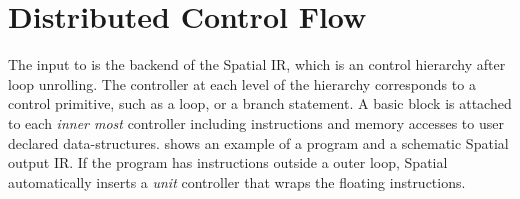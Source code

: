 \section{Distributed Control Flow}
\label{sec:control}





The input to \name is the backend of the Spatial IR, which is an control hierarchy after loop
unrolling.
The controller at each level of the hierarchy corresponds to a control primitive, such as a loop, or
a branch statement. A basic block is attached to each \emph{inner most} controller including instructions
and memory accesses to user declared data-structures.
 shows an example of a program and a schematic Spatial output IR.
If the program has instructions outside a outer loop, Spatial automatically inserts a \emph{unit}
controller that wraps the floating instructions.

